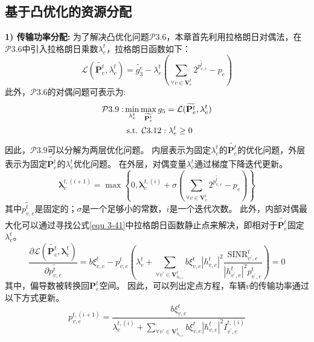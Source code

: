 \subsection{基于凸优化的资源分配}
\textbf{1) 传输功率分配:} 为了解决凸优化问题$\mathcal{P}3.6$，本章首先利用拉格朗日对偶法\cite{boyd2004convex}，在$\mathcal{P}3.6$中引入拉格朗日乘数$\lambda_{e}^{t}$，拉格朗日函数如下：
\begin{equation}
	\mathcal{L}(\widetilde{\mathbf{{P}}_{e}^{t}}, {\lambda}_{e}^{t} ) = \widetilde{g_3^{e}} -  {\lambda}_{e}^{t} (\sum_{\forall v \in \mathbf{V}_{e}^{t}} 2^{\widetilde{p_{v, e}^{t}}} - p_{e} )
	\label{equ 3-41}
\end{equation}
此外，$\mathcal{P}3.6$的对偶问题可表示为:
\begin{align}
	\mathcal{P}3.9: & \min_{{\lambda}_{e}^{t}} \max_{\widetilde{\mathbf{{P}}_{e}^{t}}}  g_5 = \mathcal{L}(\widetilde{\mathbf{{P}}_{e}^{t}}, {\lambda}_{e}^{t} ) \notag \\
	&\text { s.t. } \mathcal{C}3.12: \mathbf{\lambda}_{e}^{t} \geq 0  
\end{align}
因此，$\mathcal{P}3.9$可以分解为两层优化问题。
内层表示为固定${\lambda}_{e}^{t}$的$\widetilde{\mathbf{{P}}_{e}^{t}}$的优化问题，外层表示为固定$\widetilde{\mathbf{{P}}_{e}^{t}}$的${\lambda}_{e}^{t}$优化问题。
在外层，对偶变量${\lambda}_{e}^{t}$通过梯度下降迭代更新。
\begin{equation}
	\mathbf{\lambda}_{e}^{t, (i+1)} = \max\left\{0, \mathbf{\lambda}_{e}^{t, (i)} + \sigma (\sum_{\forall v \in \mathbf{V}_{e}^{t}} 2^{\widetilde{p_{v, e}^{t}}} - p_{e} )\right\}
\end{equation}
其中$\widetilde{p_{v, e}^{t}}$是固定的；$\sigma$是一个足够小的常数，$i$是一个迭代次数。
此外，内部对偶最大化可以通过寻找公式\ref{equ 3-41}中拉格朗日函数静止点来解决，即相对于$\widetilde{\mathbf{{P}}_{e}^{t}}$固定${\lambda}_{e}^{t}$。
\begin{equation}
\frac{\partial \mathcal{L}\left(\widetilde{\mathbf{{P}}_{e}^{t}}, \mathbf{\lambda}_{e}^{t} \right)}{\partial \widetilde{p_{v, e}^{t}}}= b  \xi_{v, e}^{t}  - p_{v, e}^{t}(\lambda_{e}^{t} +\sum\limits_{\forall v^{\prime} \in \mathbf{V}_{h_{v, e}}^{t}} b  \xi_{v, e}^{t} |h_{v, e}^t|^2 \frac{\mathrm{SINR}_{v^{\prime}, e}^t}{|h_{v^{\prime}, e}^t| ^{2} p_{v^{\prime}, e}^{t}}) =0
\end{equation}
其中，偏导数被转换回$\mathbf{P}_{e}^{t}$空间。
因此，可以列出定点方程，车辆$v$的传输功率通过以下方式更新。
\begin{equation}
p_{v, e}^{t, {(i+1)}}=\frac{b \xi_{v, e}^{t}}{\lambda_{e}^{t,(i)}+\sum\limits_{\forall v^{\prime} \in \mathbf{V}_{h_{v, e}}^{t}} b  \xi_{v, e}^{t}|h_{v, e}^t|^2 {I}_{v^{\prime}, e}^{t, (i)} }
\end{equation}
